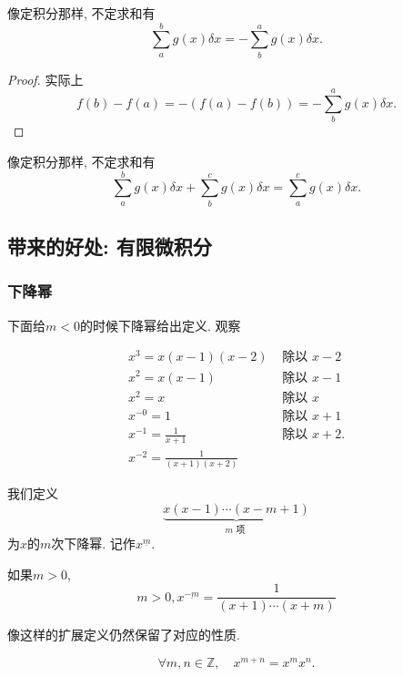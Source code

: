 \documentclass{ctexart}
\begin{document}
\begin{proposition}
	像定积分那样, 不定求和有
	$$
		\sum_a^b g(x) \delta x=-\sum_b^a g(x) \delta x .
	$$
\end{proposition}

\begin{proof}
	实际上
	$$
		f(b)-f(a)=-(f(a)-f(b))=-\sum_b^a g(x) \delta x .
	$$
\end{proof}

\begin{proposition}
	像定积分那样, 不定求和有
	$$
		\sum_a^b g(x) \delta x+\sum_b^c g(x) \delta x=\sum_a^c g(x) \delta x .
	$$
\end{proposition}

\subsection{带来的好处: 有限微积分}

\subsubsection{下降幂} 下面给$m<0$的时候下降幂给出定义. 观察

\[
	\begin{array}{ll}
		x^3=x(x-1)(x-2)             & \text { 除以 } x-2   \\
		x^2=x(x-1)                  & \text { 除以 } x-1   \\
		x^2=x                       & \text { 除以 } x     \\
		x^{-0}=1                    & \text { 除以 } x+1   \\
		x^{-1}=\frac{1}{x+1}        & \text { 除以 } x+2 . \\
		x^{-2}=\frac{1}{(x+1)(x+2)} &
	\end{array}
\]

\begin{definition}[下降幂]
	我们定义
	$$
		\underbrace{x(x-1) \cdots(x-m+1)}_{m \text { 项 }}
	$$
	为$x$的$m$次下降幂. 记作$x^{\underline m}$.

	如果$m>0$,
	$$
		m>0, x^{\underline{-m}}=\frac{1}{(x+1) \cdots(x+m)}
	$$

\end{definition}

像这样的扩展定义仍然保留了对应的性质.

\begin{proposition}[下降幂的性质]
	$$
		\forall m, n \in \mathbb{Z}, \quad x^{m+n}=x^m x^n .
	$$
\end{proposition}
\end{document}

